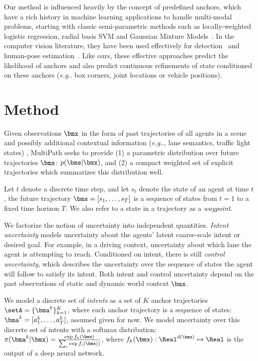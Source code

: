 \documentclass{article}
\makeatletter
\DeclareRobustCommand\onedot{\futurelet\@let@token\@onedot}
\def\@onedot{\ifx\@let@token.\else.\null\fi\xspace}
\def\eg{\emph{e.g}\onedot} \def\Eg{\emph{E.g}\onedot}
\newcommand{\multiflow}{MultiPath\xspace}
\makeatother
\begin{document}
Our method is influenced heavily by the concept of predefined anchors, which have a rich history in machine learning applications to handle multi-modal problems, starting with classic semi-parametric methods such as locally-weighted logistic regression, radial basis SVM and Gaussian Mixture Models~\cite{Bishop06}.  In the computer vision literature, they have been used effectively for detection~\cite{Erhan14} and human-pose estimation~\cite{Yang12}.  Like ours, these effective approaches predict the likelihood of anchors and also predict continuous refinements of state conditioned on these anchors (\eg box corners, joint locations or vehicle positions).


 \section{Method}
\label{sec:method}



Given observations $\bmx$ in the form of past trajectories of all agents in a scene and possibly additional contextual information (\eg, lane semantics, traffic light states)
, \multiflow seeks to provide (1) a parametric distribution over future trajectories $\bms$: $p(\bms | \bmx)$, and (2) a compact weighted set of explicit trajectories which summarizes this distribution well.

Let $t$ denote a discrete time step, and let $s_t$ denote the state of an agent at time $t$, the future trajectory $\bms = [s_1, \ldots, s_T]$ is a sequence of states from $t=1$ to a fixed time horizon $T$. We also refer to a state in a trajectory as a {\em waypoint}.

We factorize the notion of uncertainty into independent quantities. {\em Intent uncertainty} models uncertainty about the agents' latent coarse-scale intent or desired goal. For example, in a driving context, uncertainty about which lane the agent is attempting to reach. Conditioned on intent, there is still {\em control uncertainty}, which describes the uncertainty over the sequence of states the agent will follow to satisfy its intent.  Both intent and control uncertainty depend on the past observations of static and dynamic world context $\bmx$.

We model a discrete set of {\em intents} as a set of $K$ anchor trajectories $\setA=\{\bma^k\}_{k=1}^K$, where each anchor trajectory is a sequence of states: $\bma^k = [a^k_1, \ldots, a^k_T]$, assumed given for now.  We model uncertainty over this discrete set of intents with a softmax distribution: $ \pi(\bma^k | \bmx) = \frac{\exp{f_k(\bmx)}}{ \sum_i \exp{f_i(\bmx))}}$,
where $f_k(\bmx): \Real^{d(\bmx)} \mapsto \Real$ is the output of a deep neural network. 
\end{document}
